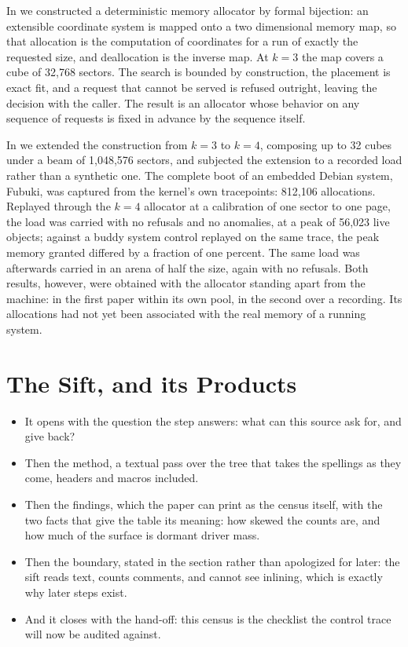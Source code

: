 \documentclass[11pt]{article}
\begin{document}
In \cite{fine2026iscandar} we constructed a deterministic memory
allocator by formal bijection: an extensible coordinate system is
mapped onto a two dimensional memory map, so that allocation is the
computation of coordinates for a run of exactly the requested size,
and deallocation is the inverse map. At $k=3$ the map covers a cube
of 32,768 sectors. The search is bounded by construction, the
placement is exact fit, and a request that cannot be served is
refused outright, leaving the decision with the caller. The result
is an allocator whose behavior on any sequence of requests is fixed
in advance by the sequence itself.

In \cite{fine2026revisited} we extended the construction from
$k=3$ to $k=4$, composing up to 32 cubes under a beam of 1,048,576
sectors, and subjected the extension to a recorded load rather than
a synthetic one. The complete boot of an embedded Debian system,
Fubuki, was captured from the kernel's own tracepoints: 812,106
allocations. Replayed through the $k=4$ allocator at a calibration
of one sector to one page, the load was carried with no refusals
and no anomalies, at a peak of 56,023 live objects; against a buddy
system control replayed on the same trace, the peak memory granted
differed by a fraction of one percent. The same load was afterwards
carried in an arena of half the size, again with no refusals. Both
results, however, were obtained with the allocator standing apart
from the machine: in the first paper within its own pool, in the
second over a recording. Its allocations had not yet been
associated with the real memory of a running system.

\section{The Sift, and its Products}

\begin{itemize}
\item It opens with the question the step answers: what can this source ask for, and give back?
\item Then the method, a textual pass over the tree that takes the spellings as they come, headers and macros included.
\item Then the findings, which the paper can print as the census itself, with the two facts that give the table its meaning: how skewed the counts are, and how much of the surface is dormant driver mass.
\item Then the boundary, stated in the section rather than apologized for later: the sift reads text, counts comments, and cannot see inlining, which is exactly why later steps exist.
\item And it closes with the hand-off: this census is the checklist the control trace will now be audited against.
\end{itemize}
\end{document}
